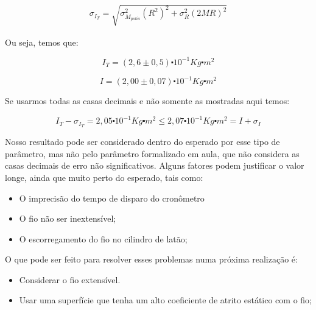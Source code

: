 \documentclass[a4paper]{article}
\begin{document}
\begin{align}
\sigma_{I_{T}}=\sqrt{\sigma_{M_{polia}}^{2}\left(R^{2}\right)^{2}+\sigma_{R}^{2}\left(2MR\right)^{2}}
\end{align}

Ou seja, temos que:

$$I_{T}=(2,6\pm0,5)\centerdot10^{-1}Kg\centerdot m^{2}$$

$$I=(2,00\pm0,07)\centerdot10^{-1}Kg\centerdot m^{2}$$

Se usarmos todas as casas decimais e não somente as mostradas aqui temos:

$$
I_{T}-\sigma_{I_{T}}=2,05\centerdot10^{-1}Kg\centerdot m^{2}\leq2,07\centerdot10^{-1}Kg\centerdot m^{2}=I+\sigma_{I}
$$

Nosso resultado pode ser considerado dentro do esperado por esse tipo de parâmetro, mas não pelo parâmetro formalizado em aula, que não considera as casas decimais de erro não significativos. Alguns fatores podem justificar o valor longe, ainda que muito perto do esperado, tais como:
\begin{itemize}
	\item O imprecisão do tempo de disparo do cronômetro
	\item O fio não ser inextensível;
	\item O escorregamento do fio no cilindro de latão;
\end{itemize}

O que pode ser feito para resolver esses problemas numa próxima realização é:
\begin{itemize}
	\item Considerar o fio extensível.
	\item Usar uma superfície que tenha um alto coeficiente de atrito estático com o fio;
\end{itemize}
\end{document}
